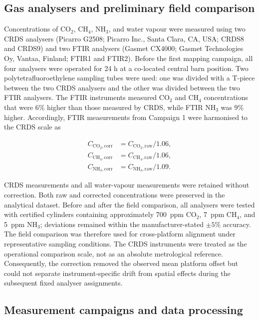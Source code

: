 \documentclass[12pt,a4paper]{article}
\begin{document}
\subsection{Gas analysers and preliminary field comparison}

Concentrations of \(\mathrm{CO_2}\), \(\mathrm{CH_4}\),
\(\mathrm{NH_3}\), and water vapour were measured using two CRDS analysers
(Picarro G2508; Picarro Inc., Santa Clara, CA, USA; CRDS8 and CRDS9) and two
FTIR analysers (Gasmet CX4000; Gasmet Technologies Oy, Vantaa, Finland; FTIR1
and FTIR2). Before the first
mapping campaign, all four analysers were operated for 24 h at a co-located
central barn position. Two polytetrafluoroethylene sampling tubes were used:
one was divided with a T-piece between the two CRDS analysers and the other
was divided between the two FTIR analysers. The FTIR instruments measured
\(\mathrm{CO_2}\) and \(\mathrm{CH_4}\) concentrations that were 6\% higher
than those measured by CRDS, while FTIR \(\mathrm{NH_3}\) was 9\% higher.
Accordingly, FTIR measurements from Campaign 1 were harmonised to the CRDS
scale as

\begin{align}
C_{\mathrm{CO_2,corr}} &= C_{\mathrm{CO_2,raw}}/1.06,\\
C_{\mathrm{CH_4,corr}} &= C_{\mathrm{CH_4,raw}}/1.06,\\
C_{\mathrm{NH_3,corr}} &= C_{\mathrm{NH_3,raw}}/1.09.
\end{align}

CRDS measurements and all water-vapour measurements were retained without
correction. Both raw and corrected concentrations were preserved in the
analytical dataset. Before and after the field comparison, all analysers were
tested with certified cylinders containing approximately \SI{700}{ppm}
\(\mathrm{CO_2}\), \SI{7}{ppm} \(\mathrm{CH_4}\), and \SI{5}{ppm}
\(\mathrm{NH_3}\); deviations remained within the manufacturer-stated
\(\pm 5\%\) accuracy. The field comparison was therefore used for
cross-platform alignment under representative sampling conditions. The CRDS
instruments were treated as the operational comparison scale, not as an
absolute metrological reference. Consequently, the correction removed the
observed mean platform offset but could not separate instrument-specific
drift from spatial effects during the subsequent fixed analyser assignments.

\subsection{Measurement campaigns and data processing}
\end{document}
